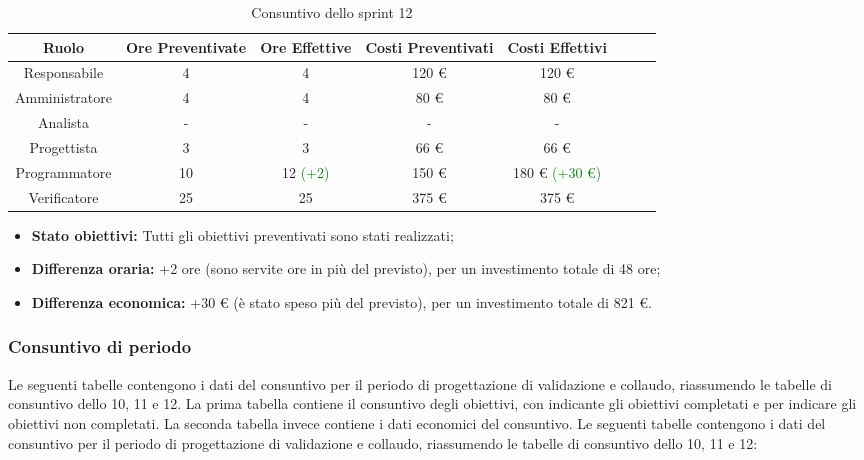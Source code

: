 \begin{table}[H]
		\begin{center}
			\setlength{\aboverulesep}{0pt}
			\setlength{\belowrulesep}{0pt}
			\setlength{\extrarowheight}{.75ex}
			\begin{tabular}{ c c c c c c c c }
				\rowcolor{AzzurroGruppo!30} 
				\textbf{Ruolo} & \textbf{Ore Preventivate} & \textbf{Ore Effettive} & \textbf{Costi Preventivati} & \textbf{Costi Effettivi}\\
				\toprule
				Responsabile   & 4 & 4 & 120 \euro{}  & 120 \euro{}\\
				Amministratore & 4 & 4 & 80 \euro{}  & 80 \euro{} \\
				Analista       & - & - & - & - \\
				Progettista    & 3 & 3 & 66 \euro{} & 66 \euro{} \\
				Programmatore  & 10 & 12 \textcolor{green}{(+2)} & 150 \euro{}  & 180 \euro{} \textcolor{green}{(+30 \euro{})} \\
				Verificatore   & 25 & 25 & 375 \euro{}  & 375 \euro{} \\
				\bottomrule
			\end{tabular}
			\caption{Consuntivo dello sprint 12}
		\end{center}
	\end{table}
	
\begin{itemize}
	\item \textbf{Stato obiettivi:} Tutti gli obiettivi preventivati sono stati realizzati;
	\item \textbf{Differenza oraria:} +2 ore (sono servite ore in più del previsto), per un investimento totale di 48 ore;
	\item \textbf{Differenza economica:} +30 \euro{} (è stato speso più del previsto), per un investimento totale di 821 \euro{}.
\end{itemize}


\subsubsection{Consuntivo di periodo}
Le seguenti tabelle contengono i dati del consuntivo per il periodo di progettazione di validazione e collaudo, riassumendo le tabelle di consuntivo dello  10, 11 e 12. La prima tabella contiene il consuntivo degli obiettivi, con \checkmark{} indicante gli obiettivi completati e \xmark{} per indicare gli obiettivi non completati. La seconda tabella invece contiene i dati economici del consuntivo.\newline{}
Le seguenti tabelle contengono i dati del consuntivo per il periodo di progettazione di validazione e collaudo, riassumendo le tabelle di consuntivo dello  10, 11 e 12:

